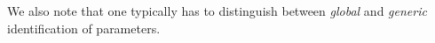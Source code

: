 \documentclass[accepted]{uai2021} %
\newtheorem{prop}[thm]{Proposition}
\begin{document}
We also note that one typically has to 
distinguish between \emph{global} and \emph{generic} identification of 
parameters.

\begin{comment}


\begin{prop}
	Let $\alpha,\beta \in O$, $\alpha\neq \beta$. The parameter 
	${\Phi}_{\beta\alpha}/(1-{\Phi}_{\beta\beta}) $ is 
	identified 
	from the observed integrated covariance if there 
	are no unobserved directed paths from 
	$\alpha$ to $\beta$ and $\Gamma_{\beta\alpha}$ is identified from 
	$\bar{C}$.
\end{prop}

\begin{proof}
	Note that ${\Phi}_{\beta\alpha}/(1-{\Phi}_{\beta\beta}) = 
	\Gamma_{\beta\alpha}$ as there 
	are no 
	unobserved directed paths from $\alpha$ to $\beta$.
\end{proof}

\begin{prop}
	Let $\alpha\in O$. The parameter $\Phi_{\alpha\alpha}$ is identified from 
	the 
	integrated mean and covariance if all 
	parents of $\alpha$ are observed and $\Theta_{\alpha\alpha}$ is identified 
	from 
	$\bar{C}$.
\end{prop}

\begin{proof}
	If all parents of $\alpha$ are observed, then $\Theta_{\alpha\alpha} = 
	\tilde{\Lambda}_{\alpha\alpha} = \Lambda_{\alpha\alpha}/(1 - 
	\bar{\Phi}_{\alpha\alpha})^2 = \Lambda_{\alpha\alpha}/(1 - 
	\Phi_{\alpha\alpha})^2$.
\end{proof}

If the spectral radius of $\Gamma$ is less than one, all parents of 
$\alpha$ are observed and $\Gamma_{\alpha\gamma}$ is 
identified for 
 every 
 $\gamma\in V$, then $\Theta_{\alpha\alpha}$ is identified from $\bar{C}$.
This follows from the $(\alpha,\alpha)$-equation in the matrix equation in 
(\ref{eq:expandTheta}).

It is immediate that $\Phi_{\beta\alpha}$ is identified if 
${\Phi}_{\beta\alpha}/(1-{\Phi}_{\beta\beta})$ and $\Phi_{\alpha\alpha}$ are 
identified. Above 
the 
conditions ensure that the parameters of the marginal system equals that of the 
original system and therefore identification in the marginal system implies 
identification in the normalized system. One could of course also consider 
identification of parameters that do not occur in the original example and also 
interpret these, e.g., parameters in $\Gamma$ that 
correspond to aggregating effects along multiple unobserved paths, similarly to 
the 
interpretation of the normalized parameters, 
${\Phi}_{\beta\alpha}/(1-{\Phi}_{\beta\beta})$.

\end{comment}
\end{document}
